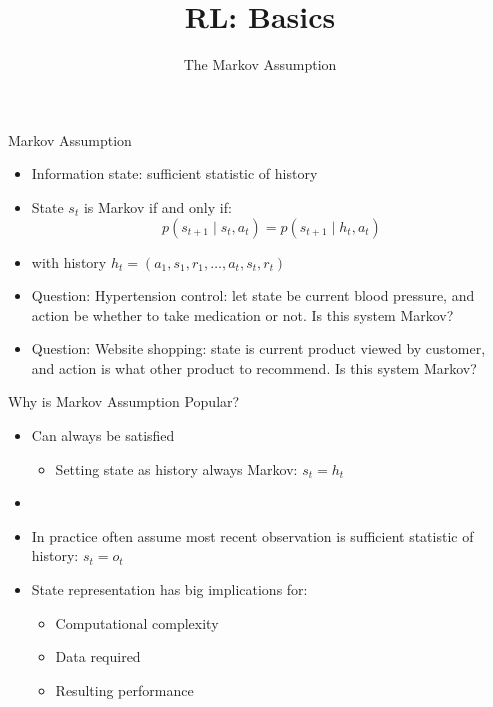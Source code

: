 


\title[Reinforcement Learning: Basics]{RL: Basics}
\subtitle{The Markov Assumption}




	
	\maketitle

\begin{frame}[c]{Markov Assumption}

\begin{itemize}
	\item Information state: sufficient statistic of history
	\item State $s_t$ is Markov if and only if:
	$$ p(s_{t+1} \mid s_t, a_t) = p(s_{t+1} \mid h_t, a_t)$$
	\item with history $h_t = (a_1, s_1, r_1, \ldots, a_t, s_t, r_t)$
	\pause
	\medskip
	\item \alert{Question:} Hypertension control: let state be current blood pressure, and action be whether to take medication or not. Is this system Markov?
	\item \alert{Question:} Website shopping: state is current product viewed by customer, and action is what other product to recommend. Is this system Markov?
\end{itemize}

\end{frame}
\begin{frame}[c]{Why is Markov Assumption Popular?}
	
	\begin{itemize}
		\item Can always be satisfied
		\begin{itemize}
			\item Setting state as history always Markov: $s_t = h_t$
		\end{itemize}
		\item \item In practice often assume most recent observation is sufficient statistic
		of history: $s_t = o_t$
		\item State representation has big implications for:
		\begin{itemize}
			\item Computational complexity
			\item Data required
			\item Resulting performance
		\end{itemize}
	\end{itemize}
	
\end{frame}



